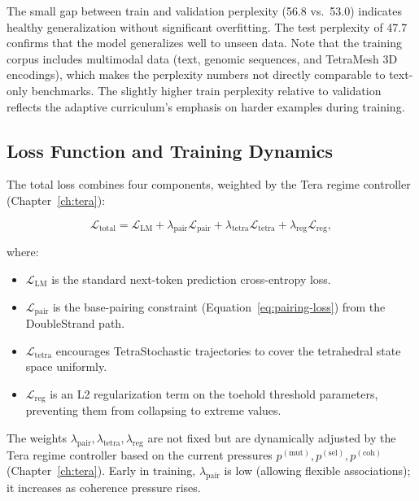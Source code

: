 The small gap between train and validation perplexity (56.8 vs.\ 53.0) indicates healthy generalization without significant overfitting. The test perplexity of 47.7 confirms that the model generalizes well to unseen data. Note that the training corpus includes multimodal data (text, genomic sequences, and TetraMesh 3D encodings), which makes the perplexity numbers not directly comparable to text-only benchmarks. The slightly higher train perplexity relative to validation reflects the adaptive curriculum's emphasis on harder examples during training.

\subsection{Loss Function and Training Dynamics}

The total loss combines four components, weighted by the Tera regime controller (Chapter~\ref{ch:tera}):

\begin{equation}
\mathcal{L}_{\mathrm{total}} = \mathcal{L}_{\mathrm{LM}} + \lambda_{\mathrm{pair}} \mathcal{L}_{\mathrm{pair}} + \lambda_{\mathrm{tetra}} \mathcal{L}_{\mathrm{tetra}} + \lambda_{\mathrm{reg}} \mathcal{L}_{\mathrm{reg}},
\label{eq:total-loss}
\end{equation}

where:
\begin{itemize}[leftmargin=1.5em]
  \item $\mathcal{L}_{\mathrm{LM}}$ is the standard next-token prediction cross-entropy loss.
  \item $\mathcal{L}_{\mathrm{pair}}$ is the base-pairing constraint (Equation~\ref{eq:pairing-loss}) from the DoubleStrand path.
  \item $\mathcal{L}_{\mathrm{tetra}}$ encourages TetraStochastic trajectories to cover the tetrahedral state space uniformly.
  \item $\mathcal{L}_{\mathrm{reg}}$ is an L2 regularization term on the toehold threshold parameters, preventing them from collapsing to extreme values.
\end{itemize}

The weights $\lambda_{\mathrm{pair}}, \lambda_{\mathrm{tetra}}, \lambda_{\mathrm{reg}}$ are not fixed but are dynamically adjusted by the Tera regime controller based on the current pressures $p^{(\mathrm{mut})}, p^{(\mathrm{sel})}, p^{(\mathrm{coh})}$ (Chapter~\ref{ch:tera}). Early in training, $\lambda_{\mathrm{pair}}$ is low (allowing flexible associations); it increases as coherence pressure rises.

